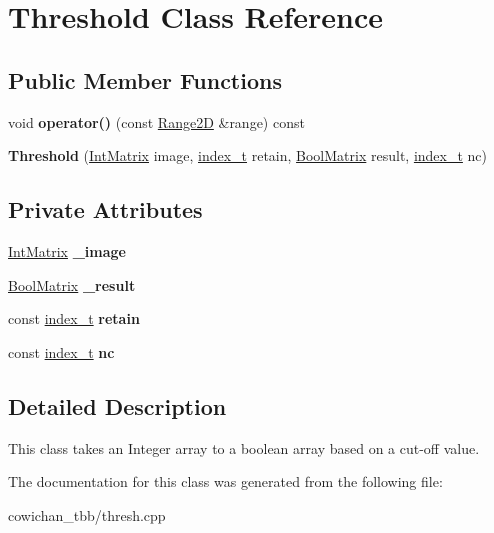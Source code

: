 \hypertarget{class_threshold}{
\section{Threshold Class Reference}
\label{class_threshold}
}
\subsection*{Public Member Functions}
\begin{CompactItemize}
\item 
\hypertarget{class_threshold_bdd06b7735ea6b46efab1685411e3d70}{
void \textbf{operator()} (const \hyperlink{cowichan__tbb_8hpp_e591b8e6980ddc5982ee22655da2ab8e}{Range2D} \&range) const }
\label{class_threshold_bdd06b7735ea6b46efab1685411e3d70}

\item 
\hypertarget{class_threshold_df53dd36b3ab7336627ab7361ab3eb97}{
\textbf{Threshold} (\hyperlink{cowichan_8hpp_82321152ddeeefe9c61350a42ed9e7af}{IntMatrix} image, \hyperlink{cowichan_8hpp_5b04577d5d21124855deaad298595371}{index\_\-t} retain, \hyperlink{cowichan_8hpp_a64c8df2f1e9c8ea68a7bcc19aca683e}{BoolMatrix} result, \hyperlink{cowichan_8hpp_5b04577d5d21124855deaad298595371}{index\_\-t} nc)}
\label{class_threshold_df53dd36b3ab7336627ab7361ab3eb97}

\end{CompactItemize}
\subsection*{Private Attributes}
\begin{CompactItemize}
\item 
\hypertarget{class_threshold_53a4f784d8bd2d813a21aa1a52e5afbb}{
\hyperlink{cowichan_8hpp_82321152ddeeefe9c61350a42ed9e7af}{IntMatrix} \textbf{\_\-image}}
\label{class_threshold_53a4f784d8bd2d813a21aa1a52e5afbb}

\item 
\hypertarget{class_threshold_f5e82e77ffad10da1dc8c6501dddcdea}{
\hyperlink{cowichan_8hpp_a64c8df2f1e9c8ea68a7bcc19aca683e}{BoolMatrix} \textbf{\_\-result}}
\label{class_threshold_f5e82e77ffad10da1dc8c6501dddcdea}

\item 
\hypertarget{class_threshold_cf3f8f39e3d71732c76525d62db39116}{
const \hyperlink{cowichan_8hpp_5b04577d5d21124855deaad298595371}{index\_\-t} \textbf{retain}}
\label{class_threshold_cf3f8f39e3d71732c76525d62db39116}

\item 
\hypertarget{class_threshold_0555939aa91492c2d58b8c650a992e77}{
const \hyperlink{cowichan_8hpp_5b04577d5d21124855deaad298595371}{index\_\-t} \textbf{nc}}
\label{class_threshold_0555939aa91492c2d58b8c650a992e77}

\end{CompactItemize}


\subsection{Detailed Description}
This class takes an Integer array to a boolean array based on a cut-off value. 

The documentation for this class was generated from the following file:\begin{CompactItemize}
\item 
cowichan\_\-tbb/thresh.cpp\end{CompactItemize}
